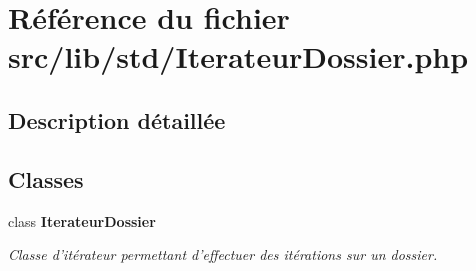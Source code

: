 \section{Référence du fichier src/lib/std/IterateurDossier.php}
\label{_iterateur_dossier_8php}


\subsection{Description détaillée}


\subsection*{Classes}
\begin{CompactItemize}
\item 
class {\bf IterateurDossier}
\begin{CompactList}\small\item\em Classe d'itérateur permettant d'effectuer des itérations sur un dossier. \item\end{CompactList}\end{CompactItemize}
